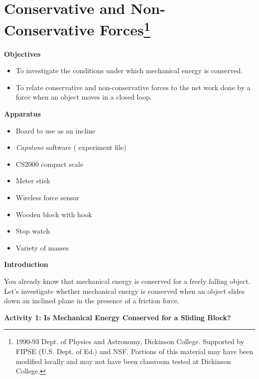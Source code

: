 
\section{Conservative and Non-Conservative Forces\footnote{
1990-93 Dept. of Physics and Astronomy, Dickinson College. Supported by FIPSE
(U.S. Dept. of Ed.) and NSF. Portions of this material may have been modified
locally and may not have been classroom tested at Dickinson College.
}}

\makelabheader %

\medskip
\textbf{Objectives} 

\begin{itemize}[nosep]
\item To investigate the conditions under which mechanical energy is conserved. 
\item To relate conservative and non-conservative forces to the net work done by a
force when an object moves in a closed loop.
\end{itemize}

\medskip
\textbf{Apparatus} 
\begin{itemize}[nosep]
\item Board to use as an incline
\item \textit{Capstone} software ( experiment file)
\item CS2000 compact scale
\item Meter stick 
\item Wireless force sensor
\item Wooden block with hook 
\item Stop watch
\item Variety of masses 

\end{itemize}

\textbf{Introduction }

You already know that mechanical energy is conserved
for a freely falling object. Let's investigate whether mechanical energy is
conserved when an object slides down an inclined plane in the presence of a
friction force.

\textbf{Activity 1: Is Mechanical Energy Conserved for a Sliding Block? }

